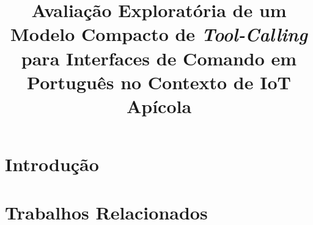 \documentclass[12pt]{article}
\title{Avaliação Exploratória de um Modelo Compacto de \emph{Tool-Calling}
para Interfaces de Comando em Português no Contexto de IoT Apícola}
\begin{document}
\maketitle

\begin{resumo}
\end{resumo}

\begin{abstract}
\end{abstract}

\section{Introdução}

\section{Trabalhos Relacionados}
\end{document}
